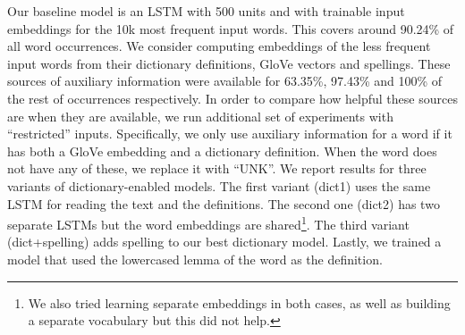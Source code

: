 \begin{table}
\end{table}

Our baseline model is an LSTM with 500 units and with trainable input embeddings for the 10k most frequent input words. This covers around 90.24\% of all word occurrences. We consider computing embeddings of the less frequent input words from their dictionary definitions, GloVe vectors and spellings. These sources of auxiliary information were available for 63.35\%, 97.43\% and 100\% of the rest of occurrences respectively. In order to compare how helpful these sources are when they are available, we run additional set of experiments with ``restricted'' inputs. Specifically, we only use auxiliary information for a word if it has both a GloVe embedding and a dictionary definition. When the word does not have any of these, we replace it with ``UNK''. We report results for three variants of dictionary-enabled models. The first variant (dict1) uses the same LSTM for reading the text and the definitions. The second one (dict2) has two separate LSTMs but the word embeddings are shared\footnote{We also tried learning separate embeddings in both cases, as well as building a separate vocabulary but this did not help.}. The third variant (dict+spelling) adds spelling to our best dictionary model. Lastly, we trained a model that used the lowercased lemma of the word as the definition. 


